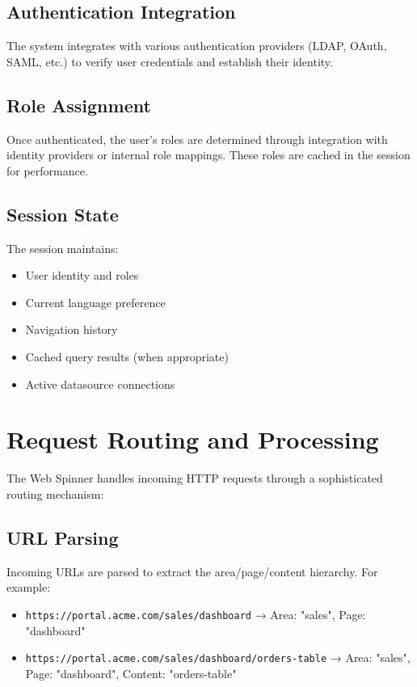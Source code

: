 \subsection{Authentication Integration}

The system integrates with various authentication providers (LDAP, OAuth, SAML, etc.) to verify user credentials and establish their identity.

\subsection{Role Assignment}

Once authenticated, the user's roles are determined through integration with identity providers or internal role mappings. These roles are cached in the session for performance.

\subsection{Session State}

The session maintains:
\begin{itemize}
	\item User identity and roles
	\item Current language preference
	\item Navigation history
	\item Cached query results (when appropriate)
	\item Active datasource connections
\end{itemize}

\section{Request Routing and Processing}
\label{sec:request-routing}

The Web Spinner handles incoming HTTP requests through a sophisticated routing mechanism:

\subsection{URL Parsing}

Incoming URLs are parsed to extract the area/page/content hierarchy. For example:
\begin{itemize}
	\item \texttt{https://portal.acme.com/sales/dashboard} → Area: "sales", Page: "dashboard"
	\item \texttt{https://portal.acme.com/sales/dashboard/orders-table} → Area: "sales", Page: "dashboard", Content: "orders-table"
\end{itemize}


